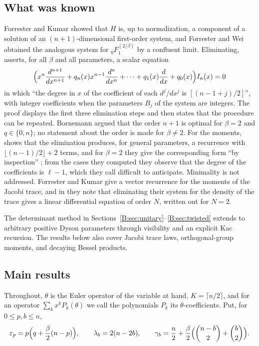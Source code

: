 \documentclass[11pt,a4paper]{article}
\theoremstyle{definition}
\theoremstyle{remark}
\newcommand{\fl}[1]{\lfloor #1\rfloor}
\newcommand{\cl}[1]{\lceil #1\rceil}
\numberwithin{equation}{section}
\begin{document}
\subsection{What was known}
Forrester and Kumar \cite[Cor.~2.5]{FK22} showed that $H$ is, up to normalization, a component of a solution of an $(n+1)$-dimensional first-order system, and Forrester and Wei \cite[Prop.~3.3]{FW26} obtained the analogous system for ${}_0F_1^{(2/\beta)}$ by a confluent limit. Eliminating, \cite[Prop.~4.1]{FW26} asserts, for all $\beta$ and all parameters, a scalar equation
\[
\Bigl(x^n\frac{d^{n+1}}{dx^{n+1}}+q_n(x)x^{n-1}\frac{d^n}{dx^n}+\dots+q_1(x)\frac{d}{dx}+q_0(x)\Bigr)I_n(x)=0
\]
in which ``the degree in $x$ of the coefficient of each $d^j/dx^j$ is $[(n-1+j)/2]$'', with integer coefficients when the parameters $B_j$ of the system are integers. The proof displays the first three elimination steps and then states that the procedure can be repeated. Bornemann \cite[App.~B]{FW26} argued that the order $n+1$ is optimal for $\beta=2$ and $q\in\{0,n\}$; no statement about the order is made for $\beta\ne2$. For the moments, \cite[Prop.~4.4]{FW26} shows that the elimination produces, for general parameters, a recurrence with $\fl{(n-1)/2}+2$ terms, and for $\beta=2$ they give the corresponding form ``by inspection'' \cite[Prop.~4.3]{FW26}; from the cases they computed they observe that the degree of the coefficients is $\ell-1$, which they call difficult to anticipate. Minimality is not addressed. Forrester and Kumar \cite[Prop.~1.2]{FK22} give a vector recurrence for the moments of the Jacobi trace, and in \cite[Remark~3.8]{FK22} they note that eliminating their system for the density of the trace gives a linear differential equation of order $N$, written out for $N=2$.

The determinant method in Sections~\ref{B:sec:unitary}--\ref{B:sec:twisted} extends to arbitrary positive Dyson parameters through visibility and an explicit Kac recursion. The results below also cover Jacobi trace laws, orthogonal-group moments, and decaying Bessel products.

\subsection{Main results}
Throughout, $\theta$ is the Euler operator of the variable at hand, $K=\cl{n/2}$, and for an operator $\sum_kx^kP_k(\theta)$ we call the polynomials $P_k$ its $\theta$-coefficients. Put, for $0\le p,b\le n$,
\begin{equation}\label{V:eq:data}
\varepsilon_p=p\Bigl(q+\frac\beta2(n-p)\Bigr),\qquad\lambda_b=2(n-2b),\qquad\gamma_b=\frac n2+\frac\beta2\Bigl(\binom{n-b}2+\binom b2\Bigr).
\end{equation}
\end{document}
